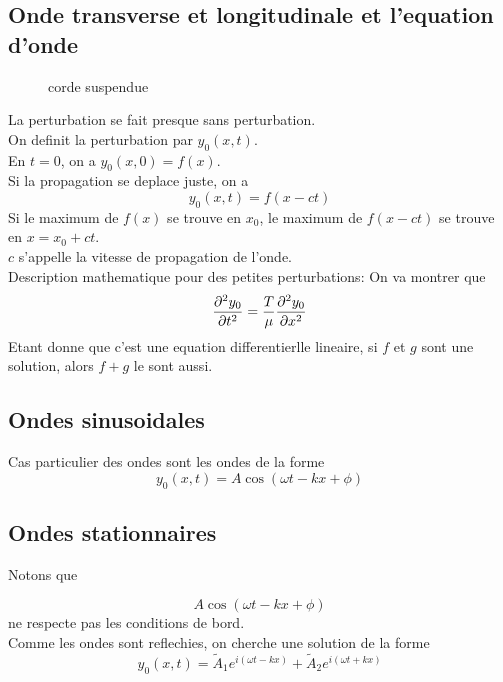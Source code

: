 \documentclass[../main.tex]{subfiles}
\begin{document}
\subsection{Onde transverse et longitudinale et l'equation d'onde}
\begin{exemple}
\begin{figure}[H]
    \centering
    \caption{corde suspendue}
    \label{fig:corde-suspendue}
\end{figure}
\end{exemple}
La perturbation se fait presque sans perturbation.\\
On  definit la perturbation par $y_0( x,t) $.\\
En $t=0$, on a $y_0( x,0) = f( x) $.\\

Si la propagation se deplace juste, on a
\[ 
	y_0( x,t) = f( x-ct) 
\]
Si le maximum de $f(x) $ se trouve en $x_0$, le maximum de $f(x-ct) $ se trouve en $x= x_0+ct$.\\
$c$ s'appelle la vitesse de propagation de l'onde.\\
Description mathematique pour des petites perturbations:
On va montrer que
\[ 
\frac{\partial ^{2} y_0}{\partial t^{2}}= \frac{T}{\mu} \frac{\partial ^{2} y_0}{\partial x^{2}}
\]
Etant donne que c'est une equation differentierlle lineaire, si $f$ et $g$ sont une solution, alors $f+g$ le sont aussi.
\subsection{Ondes sinusoidales}
Cas particulier des ondes sont les ondes de la forme
\[ 
	y_0( x,t) = A \cos ( \omega t -k x + \phi) 
\]
\subsection{Ondes stationnaires}
Notons que

\[ 
 A \cos ( \omega t -k x + \phi) 
\]
ne respecte pas les conditions de bord.\\
Comme les ondes sont reflechies, on cherche une solution de la forme 
\[ 
	y_0( x,t) = \tilde A_1 e^{i ( \omega t - kx )} + \tilde A_{2} e^{i ( \omega t + kx) }
\]
\end{document}
